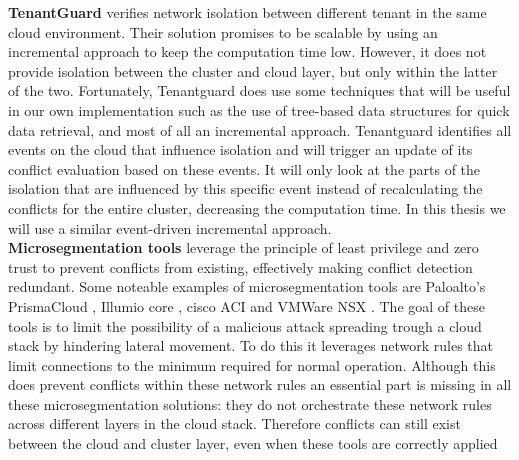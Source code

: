\textbf{TenantGuard} \cite{tenantguard} verifies network isolation between different tenant in the same cloud environment. Their solution promises to be scalable by using an incremental approach to keep the computation time low. However, it does not provide isolation between the cluster and cloud layer, but only within the latter of the two. Fortunately, Tenantguard does use some techniques that will be useful in our own implementation such as the use of tree-based data structures for quick data retrieval, and most of all an incremental approach. Tenantguard identifies all events on the cloud that influence isolation and will trigger an update of its conflict evaluation based on these events. It will only look at the parts of the isolation that are influenced by this specific event instead of recalculating the conflicts for the entire cluster, decreasing the computation time. In this thesis we will use a similar event-driven incremental approach.
\\[10pt]

\textbf{Microsegmentation tools} leverage the principle of least privilege \cite{leastprivilige} and zero trust \cite{trust} to prevent conflicts from existing, effectively making conflict detection redundant. Some noteable examples of microsegmentation tools are Paloalto's PrismaCloud \cite{prismacloud}, Illumio core \cite{illumio}, cisco ACI \cite{ciscoaci} and VMWare NSX \cite{vmwarensx}. The goal of these tools is to limit the possibility of a malicious attack spreading trough a cloud stack by hindering lateral movement. To do this it leverages network rules that limit connections to the minimum required for normal operation. Although this does prevent conflicts within these network rules an essential part is missing in all these microsegmentation solutions: they do not orchestrate these network rules across different layers in the cloud stack. Therefore conflicts can  still exist between the cloud and cluster layer, even when these tools are correctly applied 

